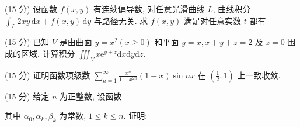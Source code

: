 \par{}
\par{}
(15 分) 设函数 $f(x, y)$ 有连续偏导数, 对任意光滑曲线 $L$, 曲线积分 $\int_{L} 2xy \, \mathrm{d}x + f(x, y) \, \mathrm{d}y$ 与路径无关. 求 $f(x, y)$ 满足对任意实数 $t$ 都有\par
\nopagebreak[4]
\par{}
(15 分) 已知 $V$ 是由曲面 $y = x^2 (x \geq 0)$ 和平面 $y = x, x + y + z = 2$ 及 $z = 0$ 围成的区域. 计算积分 $\iiint_{V} x \mathrm{e}^{y + z} \mathrm{d}x \mathrm{d}y \mathrm{d}z$.\par
\par{}
(15 分) 证明函数项级数 $\sum_{n=1}^{\infty} \frac{x^n}{1 - x^{2n}} (1 - x) \sin nx$ 在 $\left(\frac{1}{2}, 1\right)$ 上一致收敛.\par
\par{}
\par{}
(15 分) 给定 $n$ 为正整数, 设函数\par
\nopagebreak[4]
\par{}
其中 $\alpha_0, \alpha_k, \beta_k$ 为常数, $1 \leq k \leq n$. 证明:\par
\nopagebreak[4]
